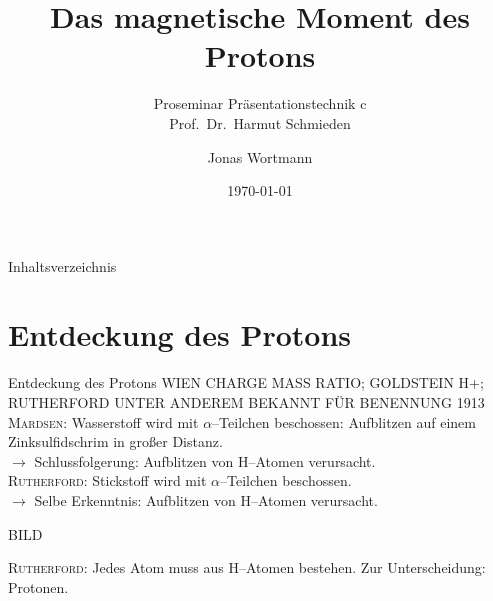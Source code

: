 \documentclass[t,9pt]{beamer}
\title{Das magnetische Moment des Protons}
\subtitle{Proseminar Präsentationstechnik c \\\tiny Prof.\ Dr.\ Harmut Schmieden}
\author{Jonas Wortmann}
\institute{Universität Bonn}
\date{\today}
\begin{document}
        \begin{frame}
                \titlepage
        \end{frame}

        \begin{frame}{Inhaltsverzeichnis}
                \tableofcontents[pausesections]
        \end{frame}

        \section{Entdeckung des Protons}
        \begin{frame}{Entdeckung des Protons}
                \pause
                WIEN CHARGE MASS RATIO; GOLDSTEIN H+; RUTHERFORD UNTER ANDEREM BEKANNT FÜR BENENNUNG
                1913 \textsc{Mardsen}: Wasserstoff wird mit $\alpha $--Teilchen beschossen: \glqq Aufblitzen\grqq{} auf einem Zinksulfidschrim in großer Distanz.\cite{Rutherford_proton_discovery}
                \pause
                \\ $\rightarrow $ Schlussfolgerung: \glqq Aufblitzen\grqq{} von H--Atomen verursacht.
                \pause
                \\ \textsc{Rutherford}: Stickstoff wird mit $\alpha $--Teilchen beschossen.
                \pause
                \\ $\rightarrow $ Selbe Erkenntnis: \glqq Aufblitzen\grqq{} von H--Atomen verursacht.
                \pause
                \begin{center}
                        BILD
                \end{center}
                 \textsc{Rutherford}: Jedes Atom muss aus H--Atomen bestehen. Zur Unterscheidung: Protonen.
        \end{frame}
\end{document}
